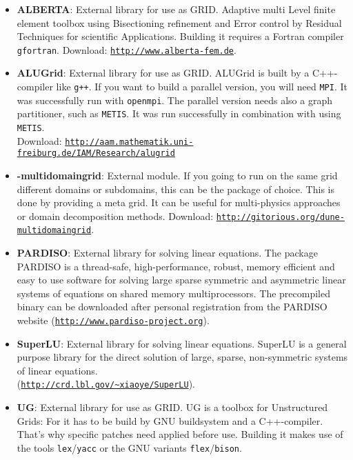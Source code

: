 \begin{itemize}
\item \textbf{ALBERTA}: External library for use as GRID. Adaptive multi Level finite element toolbox using Bisectioning refinement and Error control by Residual Techniques for scientific Applications. Building it requires a Fortran compiler \texttt{gfortran}. Download: \texttt{\url{http://www.alberta-fem.de}}.

\item \textbf{ALUGrid}: External library for use as GRID. ALUGrid is built by a C++-compiler like \texttt{g++}. If you want to build a parallel version, you will need \texttt{MPI}. It was successfully run with \texttt{openmpi}. The parallel version needs also a graph partitioner, such as \texttt{METIS}. It was run successfully in combination with \Dune using \texttt{METIS}. \\
Download: \texttt{\url{http://aam.mathematik.uni-freiburg.de/IAM/Research/alugrid}}

\item \textbf{\Dune-multidomaingrid}: External module. If you going to run on the same grid different domains or subdomains,
this can be the package of choice. This is done by providing a meta grid. It can be useful for multi-physics approaches or domain decomposition methods. Download: \texttt{\url{http://gitorious.org/dune-multidomaingrid}}. 

\item \textbf{PARDISO}: External library for solving linear equations. The package PARDISO is a thread-safe, high-performance, robust, memory efficient and easy to use software for solving large sparse symmetric and asymmetric linear systems of equations on shared memory multiprocessors. The precompiled binary can be downloaded after personal registration from the PARDISO website (\texttt{\url{http://www.pardiso-project.org}}).

\item \textbf{SuperLU}: External library for solving linear equations. SuperLU is a general purpose library for the direct solution of large, sparse, non-symmetric systems of linear equations. \\ (\texttt{\url{http://crd.lbl.gov/~xiaoye/SuperLU}}).

\item \textbf{UG}: External library for use as GRID. UG is a toolbox for Unstructured Grids: For \Dumux it has to be build by GNU buildsystem and a C++-compiler. That's why \Dune specific patches need applied before use. Building it makes use of the tools \texttt{lex}/\texttt{yacc} or the GNU variants \texttt{flex}/\texttt{bison}. 

\end{itemize}

